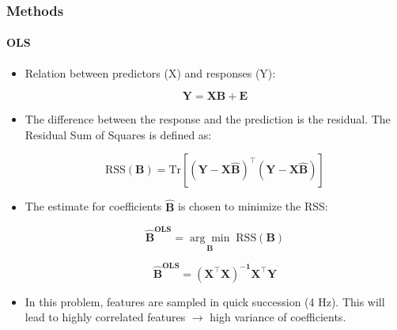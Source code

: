 \documentclass{beamer}
\begin{document}
\begin{frame}
	\frametitle{Methods}
	\framesubtitle{OLS}
	
	\begin{itemize}
	\item Relation between predictors (X) and responses (Y):

	\begin{equation}
		\label{eqn:ols}
		\mathbf{Y = XB +  E}
	\end{equation}

\item The difference between the response and the prediction is the residual. The Residual Sum of Squares is defined as:
	
	\begin{equation} 
		\label{eqn:rss}
		\text{RSS}(\mathbf{B}) = \text{Tr}[\mathbf{(Y-X\hat{B})^\intercal (Y-X\hat{B})}]
	\end{equation}

\item The estimate for coefficients $\hat{\mathbf{B}}$ is chosen to minimize the RSS:

	\begin{equation}
		\label{eqn:betahat}
		\mathbf{\hat{B}^\text{OLS}} = \underset{\mathbf{B}}{\arg\min} 	\; 	\text{RSS}(\mathbf{B})
	\end{equation}

\begin{equation}
	\label{eqn:ols_beta}
	\mathbf{\hat{B}^\text{OLS}} = \mathbf{(X^\intercal X)^{-1} X^\intercal Y}
\end{equation}

\item In this problem, features are sampled in quick succession (4 Hz). This will lead to highly correlated features $\rightarrow$ high variance of coefficients.
\end{itemize}
	
\end{frame}
\end{document}
